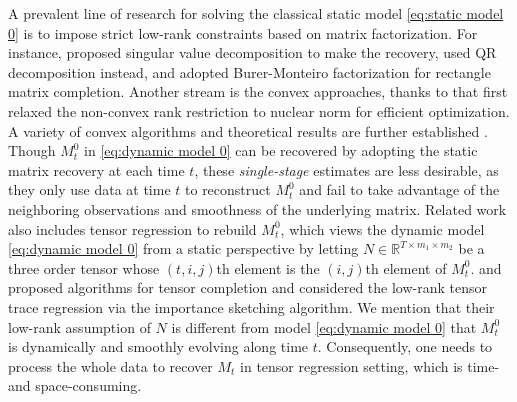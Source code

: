 \documentclass[12pt]{article}
\def\red{\textcolor{red}}
\begin{document}
A prevalent line of research for solving the classical static model \eqref{eq:static model 0} is to impose strict low-rank constraints based on matrix factorization. For instance, \cite{keshavan2009matrix} proposed singular value decomposition to make the recovery, \cite{zhao2015nonconvex} used QR decomposition instead, and \cite{zheng2016convergence} adopted Burer-Monteiro factorization for rectangle matrix completion. %
  Another stream is the convex approaches, thanks to \cite{candes2009exact} that first relaxed the non-convex rank restriction to nuclear norm for efficient optimization. 
  A variety of convex algorithms and theoretical results are further established \citep{recht_guaranteed_2010,candes2011tight%
  ,agarwal2012noisy}. 
  Though $M_t^0$ in \eqref{eq:dynamic model 0} can be recovered by adopting the static matrix recovery at each time $t$, these {\it single-stage} estimates are less desirable, as they only use data at time $t$ to reconstruct $M_t^0$ and fail to take advantage of the neighboring observations and smoothness of the underlying matrix. %
Related work also includes tensor regression to rebuild $M_t^0$, which views the dynamic model \eqref{eq:dynamic model 0} from a static perspective by letting $N\in\mathbb{R}^{T\times m_1\times m_2}$ be a three order tensor whose $(t,i,j)$th element is the $(i,j)$th element of $M_t^0$. %
 \cite{gandy2011tensor} and \cite{liu2012tensor} %
  proposed algorithms for tensor completion and %
  \cite{zhang2020islet} considered the low-rank tensor trace regression via the importance sketching algorithm. %
We mention that their low-rank assumption of $N$ is different from model \eqref{eq:dynamic model 0} that $M_t^0$ is dynamically and smoothly evolving along time $t$. Consequently, one needs to process the whole data to recover $M_t$ in tensor regression setting, which is time- and space-consuming. 
\end{document}
